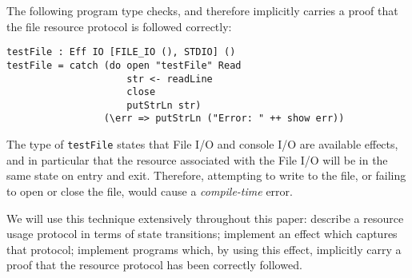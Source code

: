 The following program type checks, and therefore implicitly carries 
a proof that the file resource protocol is followed correctly:

\begin{Verbatim}
testFile : Eff IO [FILE_IO (), STDIO] () 
testFile = catch (do open "testFile" Read
                     str <- readLine
                     close
                     putStrLn str)
                 (\err => putStrLn ("Error: " ++ show err))
\end{Verbatim}


The type of \texttt{testFile} states
that File I/O and console I/O are available effects, and in particular that
the resource associated with the File I/O will be in the same state on entry
and exit.
Therefore, attempting to write to the file, or failing to open or close the
file, would cause a \emph{compile-time} error. 

We will use this technique extensively
throughout this paper: describe a resource usage protocol in terms of
state transitions; implement an effect which captures that protocol; implement
programs which, by using this effect, implicitly carry a proof that the resource
protocol has been correctly followed.



